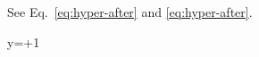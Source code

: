 \documentclass{article}
\begin{document}
See Eq.~\ref{eq:hyper-after} and \cref{eq:hyper-after}.
\begin{annotatedequation}[numbered]
y=+1\label{eq:hyper-after}
\end{annotatedequation}
\end{document}
